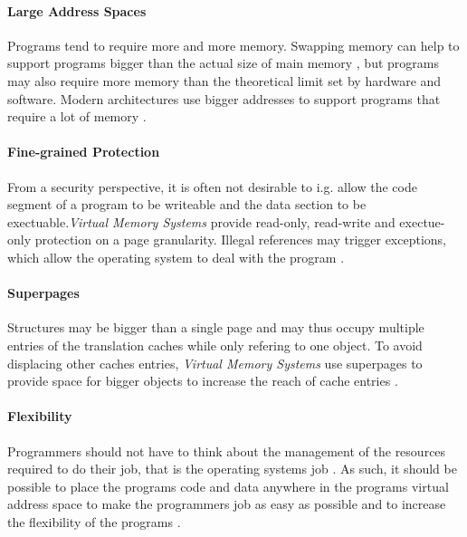 
\paragraph{Large Address Spaces} Programs tend to require more and more memory. Swapping memory can help
to support programs bigger than the actual size of main memory \cite{tanenbaumOS}, but programs may
also require more memory than the theoretical limit set by hardware and software. Modern architectures
use bigger addresses to support programs that require a lot of memory
\cite{jacobSoftwaremanagedAddressTranslation1997, jacobVirtualMemoryContemporary1998}.


\paragraph{Fine-grained Protection} From a security perspective, it is often not desirable to i.g. allow the code segment
of a program to be writeable and the data section to be exectuable.\textit{Virtual Memory Systems} provide read-only,
read-write and exectue-only protection on a page granularity\cite{jacobSoftwaremanagedAddressTranslation1997}.
Illegal references may trigger exceptions, which allow the operating system to deal with the program \cite{jacobVirtualMemoryContemporary1998}.


\paragraph{Superpages}
Structures may be bigger than a single page and may thus occupy multiple entries of the translation caches while
only refering to one object. To avoid displacing other caches entries, \textit{Virtual Memory Systems} use
superpages to provide space for bigger objects to increase the reach of cache entries \cite{jacobSoftwaremanagedAddressTranslation1997}.


\paragraph{Flexibility} Programmers should not have to think about the management
of the resources required to do their job, that is the operating systems job
\cite{tanenbaumOS}. As such, it should be possible to place the programs code
and data anywhere in the programs virtual address space to make the programmers
job as easy as possible and to increase the flexibility of the programs
\cite{jacob1998virtualissues}. %

